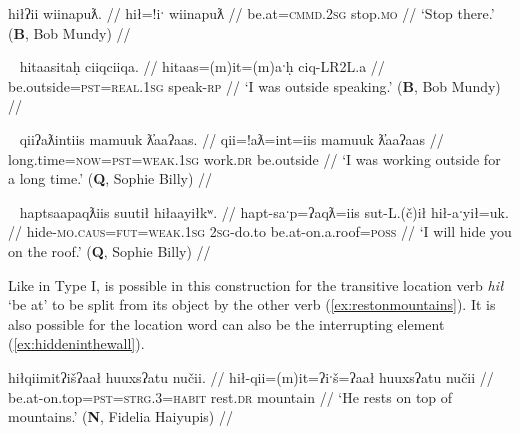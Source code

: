 \ex \label{ex:stopthere}
\begingl
\glpreamble hiłʔii wiinapuƛ. //
\gla hił=!iˑ wiinapuƛ //
\glb be.at=\textsc{cmmd.2sg} stop.\textsc{mo} //
\glft `Stop there.' (\textbf{B}, Bob Mundy) //
\endgl
\xe

\begin{comment}
\ex \label{ex:workathome}
\begingl
\glpreamble hiłitin maḥt̓iiʔakqas mamuuk. //
\gla hił=(m)it=(m)in maḥt̓ii=ʔak=qaˑs mamuuk //
\glb be.at=\textsc{pst}=\textsc{strg.1pl} house=\textsc{poss}=\textsc{defn.1sg} work.\textsc{dr} //
\glft `We worked at my house.' (\textbf{N}, Fidelia Haiyupis) //
\endgl
\xe

\ex \label{ex:screamatbeach}
\begingl
\glpreamble n̓aʔiičiʔeƛ naʔuu łuucma ʕiikʕiika hitinqis. //
\gla n̓a-°iˑčiƛ=!aƛ naʔuu łuucma ʕik-LR2L.a hitinqis //
\glb see-\textsc{in}=\textsc{now} be.with woman=\textsc{poss} scream-\textsc{rp} be.at.beach //
\glft `He heard a woman screaming on the beach.' (\textbf{C}, \textit{tupaat} Julia Lucas) //
\endgl
\xe
\end{comment}


\ex~ \label{ex:speakoutside}
\begingl
\glpreamble hitaasitaḥ ciiqciiqa. //
\gla hitaas=(m)it=(m)aˑḥ ciq-LR2L.a //
\glb be.outside=\textsc{pst}=\textsc{real.1sg} speak-\textsc{rp} //
\glft `I was outside speaking.' (\textbf{B}, Bob Mundy) //
\endgl
\xe

\ex~ \label{ex:speakoutside}
\begingl
\glpreamble qiiʔaƛintiis mamuuk ƛ̓aaʔaas. //
\gla qii=!aƛ=int=iis mamuuk ƛ̓aaʔaas //
\glb long.time=\textsc{now}=\textsc{pst}=\textsc{weak.1sg} work.\textsc{dr} be.outside //
\glft `I was working outside for a long time.' (\textbf{Q}, Sophie Billy) //
\endgl
\xe

\ex~ \label{ex:hideonroof}
\begingl
\glpreamble haptsaapaqƛiis suutił hiłaayiłkʷ. //
\gla hapt-saˑp=ʔaqƛ=iis sut-L.(č)ił hił-aˑyił=uk. //
\glb hide-\textsc{mo.caus}=\textsc{fut}=\textsc{weak.1sg} \textsc{2sg}-do.to be.at-on.a.roof=\textsc{poss} //
\glft `I will hide you on the roof.' (\textbf{Q}, Sophie Billy) //
\endgl
\xe

Like in Type I, is possible in this construction for the transitive location verb \textit{hił} `be at' to be split from its object by the other verb (\ref{ex:restonmountains}). It is also possible for the location word can also be the interrupting element (\ref{ex:hiddeninthewall}).

\ex \label{ex:restonmountains}
\begingl
\glpreamble hiłqiimitʔišʔaał huuxsʔatu nučii. //
\gla hił-qii=(m)it=ʔiˑš=ʔaał huuxsʔatu nučii //
\glb be.at-on.top=\textsc{pst}=\textsc{strg.3}=\textsc{habit} rest.\textsc{dr} mountain //
\glft `He rests on top of mountains.' (\textbf{N}, Fidelia Haiyupis) //
\endgl
\xe


